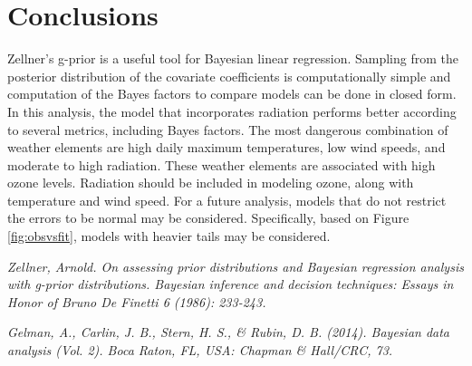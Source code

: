 \documentclass{../../tex_template/asaproc}
\begin{document}
\section{Conclusions}
Zellner's g-prior is a useful tool for Bayesian linear regression. Sampling
from the posterior distribution of the covariate coefficients is
computationally simple and computation of the Bayes factors to compare models
can be done in closed form. In this analysis, the model that incorporates
radiation performs better according to several metrics, including Bayes
factors. The most dangerous combination of weather elements are high daily
maximum temperatures, low wind speeds, and moderate to high radiation. These
weather elements are associated with high ozone levels. Radiation should be
included in modeling ozone, along with temperature and wind speed. For a future
analysis, models that do not restrict the errors to be normal may be
considered. Specifically, based on Figure \ref{fig:obsvsfit}, models with
heavier tails may be considered.

\begin{references}
{\footnotesize
\itemsep=3pt
\item {\em Zellner, Arnold. On assessing prior distributions and Bayesian regression analysis with g-prior distributions. Bayesian inference and decision techniques: Essays in Honor of Bruno De Finetti 6 (1986): 233-243.}
\item {\em Gelman, A., Carlin, J. B., Stern, H. S., \& Rubin, D. B. (2014). Bayesian data analysis (Vol. 2). Boca Raton, FL, USA: Chapman \& Hall/CRC, 73.}
}
\end{references}
\end{document}
